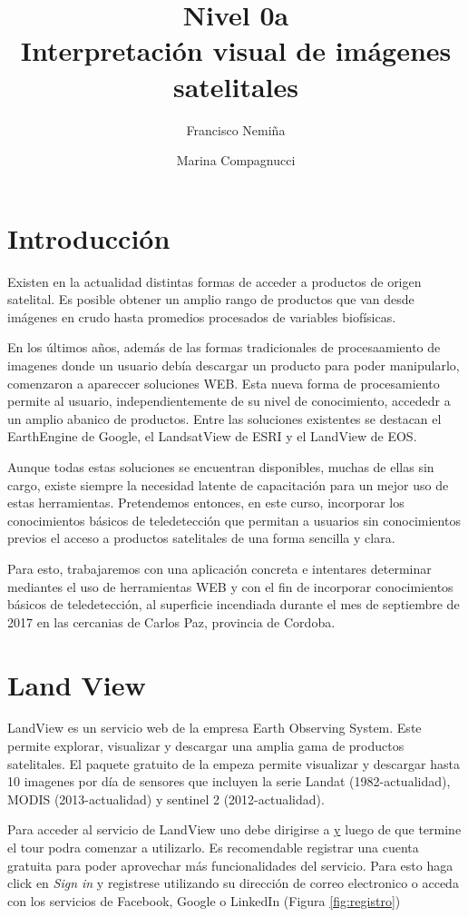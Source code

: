 \documentclass[a4paper,10pt]{article}
\title{{\large Nivel 0a} \\ Interpretación visual de imágenes satelitales}
\author{Francisco Nemiña \and Marina Compagnucci}
\begin{document}
\maketitle
\titlepage

\section{Introducción}
Existen en la actualidad distintas formas de acceder a productos de origen satelital. Es posible obtener un amplio rango de productos que van desde imágenes en crudo hasta promedios procesados de variables biofísicas.

En los últimos años, además de las formas tradicionales de procesaamiento de imagenes donde un usuario debía descargar un producto para poder manipularlo, comenzaron a apareccer soluciones WEB. Esta nueva forma de procesamiento permite al usuario, independientemente de su nivel de conocimiento, accededr a un amplio abanico de productos. Entre las soluciones existentes se destacan el EarthEngine de Google, el LandsatView de ESRI y el LandView de EOS.

Aunque todas estas soluciones se encuentran disponibles, muchas de ellas sin cargo, existe siempre la necesidad latente de capacitación para un mejor uso de estas herramientas. Pretendemos entonces, en este curso, incorporar los conocimientos básicos de teledetección que permitan a usuarios sin conocimientos previos el acceso a productos satelitales de una forma sencilla y clara.

Para esto, trabajaremos con una aplicación concreta e intentares determinar mediantes el uso de herramientas WEB y con el fin de incorporar conocimientos básicos de teledetección, al superficie incendiada durante el mes de septiembre de 2017 en las cercanias de Carlos Paz, provincia de Cordoba.

\section{Land View}

LandView es un servicio web de la empresa Earth Observing System. Este permite explorar, visualizar y descargar una amplia gama de productos satelitales. El paquete gratuito de la empeza permite visualizar y descargar hasta 10 imagenes por día de sensores que incluyen la serie Landat (1982-actualidad), MODIS (2013-actualidad) y sentinel 2 (2012-actualidad).

Para acceder al servicio de LandView uno debe dirigirse a \href{https://lv.eosda.com} y luego de que termine el tour podra comenzar a utilizarlo. Es recomendable registrar una cuenta gratuita para poder aprovechar más funcionalidades del servicio. Para esto haga click en \emph{Sign in} y registrese utilizando su dirección de correo electronico o acceda con los servicios de Facebook, Google o LinkedIn (Figura \ref{fig:registro})
\end{document}
